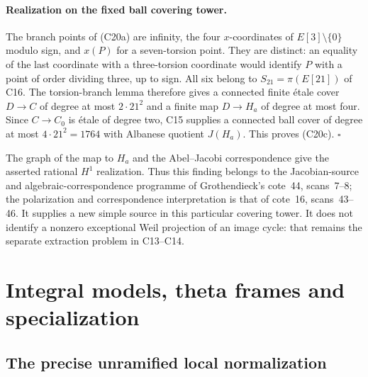 \documentclass[11pt]{article}
\theoremstyle{definition}\newtheorem{definition}[theorem]{Definition}\newtheorem{remark}[theorem]{Remark}
\begin{document}
\paragraph{Realization on the fixed ball covering tower.}
The branch points of (C20a) are infinity, the four
$x$-coordinates of $E[3]\setminus\{0\}$ modulo sign,
and $x(P)$ for a seven-torsion point. They are distinct:
an equality of the last coordinate with a three-torsion
coordinate would identify $P$ with a point of order
dividing three, up to sign. All six belong to
$S_{21}=\pi(E[21])$ of C16. The torsion-branch lemma
therefore gives a connected finite \'etale cover
$D\to C$ of degree at most $2\cdot21^2$ and a finite
map $D\to H_a$ of degree at most four. Since
$C\to C_0$ is \'etale of degree two, C15 supplies
a connected ball cover of degree at most
$4\cdot21^2=1764$ with Albanese quotient $J(H_a)$.
This proves (C20c). \hfill$\square$

The graph of the map to $H_a$ and the Abel--Jacobi
correspondence give the asserted rational $H^1$
realization. Thus this finding belongs to the
Jacobian-source and algebraic-correspondence programme
of Grothendieck's cote~44, scans~7--8; the
polarization and correspondence interpretation is
that of cote~16, scans~43--46. It supplies a new
simple source in this particular covering tower.
It does not identify a nonzero exceptional Weil
projection of an image cycle: that remains the
separate extraction problem in C13--C14.


\section{Integral models, theta frames and specialization}

\subsection{The precise unramified local normalization}
\end{document}
